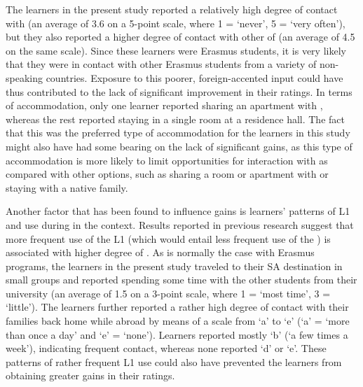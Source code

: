 \documentclass[output=paper]{langsci/langscibook}
\begin{document}
The learners in the present study reported a relatively high degree of contact with   (an average of 3.6 on a 5-point scale, where 1 = ‘never’, 5 = ‘very often’), but they also reported a higher degree of contact with other  of  (an average of 4.5 on the same scale). Since these learners were Erasmus students, it is very likely that they were in contact with other Erasmus students from a variety of non- speaking countries. Exposure to this poorer, foreign-accented  input could have thus contributed to the lack of significant improvement in their  ratings. In terms of accommodation, only one learner reported sharing an apartment with  , whereas the rest reported staying in a single room at a residence hall. The fact that this was the preferred type of accommodation for the learners in this study might also have had some bearing on the lack of significant  gains, as this type of accommodation is more likely to limit opportunities for interaction with  as compared with other options, such as sharing a room or apartment with  or staying with a native family.

Another factor that has been found to influence  gains is learners’ patterns of L1 and  use during  in the  context. Results reported in previous research suggest that more frequent use of the L1 (which would entail less frequent use of the ) is associated with higher degree of  \citep{FlegeEtAl1997,PiskeEtAl2001}. As is normally the case with Erasmus programs, the learners in the present study traveled to their SA destination in small groups and reported spending some time with the other students from their  university (an average of 1.5 on a 3-point scale, where 1 = ‘most time’, 3 = ‘little’). The learners further reported a rather high degree of contact with their families back home while abroad by means of a scale from ‘a’ to ‘e’ (‘a’ = ‘more than once a day’ and ‘e’ = ‘none’). Learners reported mostly ‘b’ (‘a few times a week’), indicating frequent contact, whereas none reported ‘d’ or ‘e’. These patterns of rather frequent L1 use could also have prevented the learners from obtaining greater gains in their  ratings.
\end{document}
